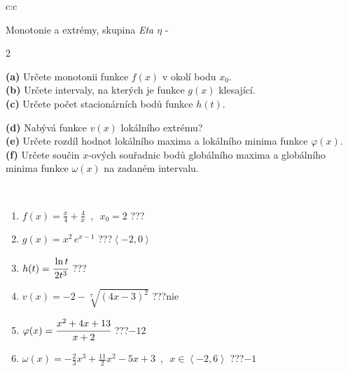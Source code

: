 \documentclass[10pt]{report}
\begin{document}
\newpage
\thispagestyle{empty}
\begin{tabular}{c:c}
\begin{minipage}[c][104.5mm][t]{0.5\linewidth}
\begin{center}
\vspace{7mm}
{\huge Monotonie a extrémy, skupina \textit{Eta $\eta$} -}\\[5mm]
\begin{minipage}{0.95\linewidth}
\begin{center}
{\small \begin{multicols}{2} \raggedright
\textbf{(a)} Určete monotonii funkce \(f(x)\) v okolí bodu \(x_0\). \\[1mm]
\textbf{(b)} Určete intervaly, na kterých je funkce \(g(x)\) klesající. \\[1mm]
\textbf{(c)} Určete počet stacionárních bodů funkce \(h(t)\). \par \columnbreak
\textbf{(d)} Nabývá funkce \(v(x)\) lokálního extrému? \\[1mm]
\textbf{(e)} Určete rozdíl hodnot lokálního maxima a lokálního minima funkce \(\varphi(x)\). \\[1mm]
\textbf{(f)} Určete součin \(x\)-ových souřadnic bodů globálního maxima a globálního minima funkce \(\omega(x)\) na zadaném intervalu. \\[1mm]
\end{multicols}
}
\end{center}
\end{minipage}
\\[4mm]
\begin{minipage}{0.79\linewidth}
\begin{center}
\begin{varwidth}{\linewidth}
\begin{enumerate}
\normalsize
\item $f(x)=\frac{x}{4}+\frac{4}{x} \enspace , \enspace x_0=2$\quad \dotfill\; ???\;\dotfill \quad {}
\item $g(x)=x^2\, e^{x-1}$\quad \dotfill\; ???\;\dotfill \quad $\left\langle-2 , 0\right\rangle$
\item $h(t)=\cfrac{\ln t}{2t^3}$\quad \dotfill\; ???\;\dotfill {}
\item $v(x)=-2-\sqrt[7]{(4x-3)^2}$\quad \dotfill\; ???\;\dotfill \quad $\text{nie}$
\item $\varphi(x)=\cfrac{x^2+4x+13}{x+2}$\quad \dotfill\; ???\;\dotfill \quad $-12$
\item $\omega(x)=-\frac{2}{3}x^3+\frac{11}{2}x^2-5x+3 \enspace , \enspace x\in\left\langle-2 , 6\right\rangle$\quad \dotfill\; ???\;\dotfill \quad $-1$

\end{enumerate}
\end{varwidth}
\end{center}
\end{minipage}
\end{center}
\end{minipage}
\end{tabular}
\end{document}
